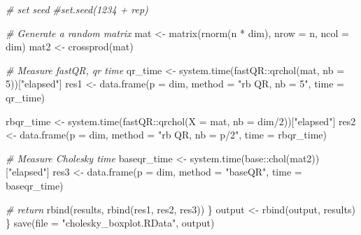 \documentclass[]{tufte-handout}
\newenvironment{Shaded}{}{}
\newcommand{\AttributeTok}[1]{\textcolor[rgb]{0.49,0.56,0.16}{#1}}
\newcommand{\CommentTok}[1]{\textcolor[rgb]{0.38,0.63,0.69}{\textit{#1}}}
\newcommand{\DecValTok}[1]{\textcolor[rgb]{0.25,0.63,0.44}{#1}}
\newcommand{\FunctionTok}[1]{\textcolor[rgb]{0.02,0.16,0.49}{#1}}
\newcommand{\NormalTok}[1]{#1}
\newcommand{\OtherTok}[1]{\textcolor[rgb]{0.00,0.44,0.13}{#1}}
\newcommand{\SpecialCharTok}[1]{\textcolor[rgb]{0.25,0.44,0.63}{#1}}
\newcommand{\StringTok}[1]{\textcolor[rgb]{0.25,0.44,0.63}{#1}}
\begin{document}
\begin{Shaded}
\begin{Highlighting}[]
    \CommentTok{\# set seed}
    \CommentTok{\#set.seed(1234 + rep)}
    
    \CommentTok{\# Generate a random matrix}
\NormalTok{    mat  }\OtherTok{\textless{}{-}} \FunctionTok{matrix}\NormalTok{(}\FunctionTok{rnorm}\NormalTok{(n }\SpecialCharTok{*}\NormalTok{ dim), }\AttributeTok{nrow =}\NormalTok{ n, }\AttributeTok{ncol =}\NormalTok{ dim)}
\NormalTok{    mat2 }\OtherTok{\textless{}{-}} \FunctionTok{crossprod}\NormalTok{(mat)}
    
    \CommentTok{\# Measure fastQR, qr time}
\NormalTok{    qr\_time }\OtherTok{\textless{}{-}} \FunctionTok{system.time}\NormalTok{(fastQR}\SpecialCharTok{::}\FunctionTok{qrchol}\NormalTok{(mat, }\AttributeTok{nb =} \DecValTok{5}\NormalTok{))[}\StringTok{"elapsed"}\NormalTok{]}
\NormalTok{    res1    }\OtherTok{\textless{}{-}} \FunctionTok{data.frame}\NormalTok{(}\AttributeTok{p =}\NormalTok{ dim, }\AttributeTok{method =} \StringTok{"rb QR, nb = 5"}\NormalTok{, }\AttributeTok{time =}\NormalTok{ qr\_time)}
    
\NormalTok{    rbqr\_time }\OtherTok{\textless{}{-}} \FunctionTok{system.time}\NormalTok{(fastQR}\SpecialCharTok{::}\FunctionTok{qrchol}\NormalTok{(}\AttributeTok{X =}\NormalTok{ mat, }\AttributeTok{nb =}\NormalTok{ dim}\SpecialCharTok{/}\DecValTok{2}\NormalTok{))[}\StringTok{"elapsed"}\NormalTok{]}
\NormalTok{    res2      }\OtherTok{\textless{}{-}} \FunctionTok{data.frame}\NormalTok{(}\AttributeTok{p =}\NormalTok{ dim, }\AttributeTok{method =} \StringTok{"rb QR, nb = p/2"}\NormalTok{, }\AttributeTok{time =}\NormalTok{ rbqr\_time)}
    
    \CommentTok{\# Measure Cholesky time}
\NormalTok{    baseqr\_time }\OtherTok{\textless{}{-}} \FunctionTok{system.time}\NormalTok{(base}\SpecialCharTok{::}\FunctionTok{chol}\NormalTok{(mat2))[}\StringTok{"elapsed"}\NormalTok{]}
\NormalTok{    res3        }\OtherTok{\textless{}{-}} \FunctionTok{data.frame}\NormalTok{(}\AttributeTok{p =}\NormalTok{ dim, }\AttributeTok{method =} \StringTok{"baseQR"}\NormalTok{,  }\AttributeTok{time =}\NormalTok{ baseqr\_time)}
    
    \CommentTok{\# return}
    \FunctionTok{rbind}\NormalTok{(results, }\FunctionTok{rbind}\NormalTok{(res1, res2, res3))}
\NormalTok{  \}}
\NormalTok{  output }\OtherTok{\textless{}{-}} \FunctionTok{rbind}\NormalTok{(output, results)}
\NormalTok{\}}
\FunctionTok{save}\NormalTok{(}\AttributeTok{file =} \StringTok{"cholesky\_boxplot.RData"}\NormalTok{, output)}
\end{Highlighting}
\end{Shaded}
\end{document}
